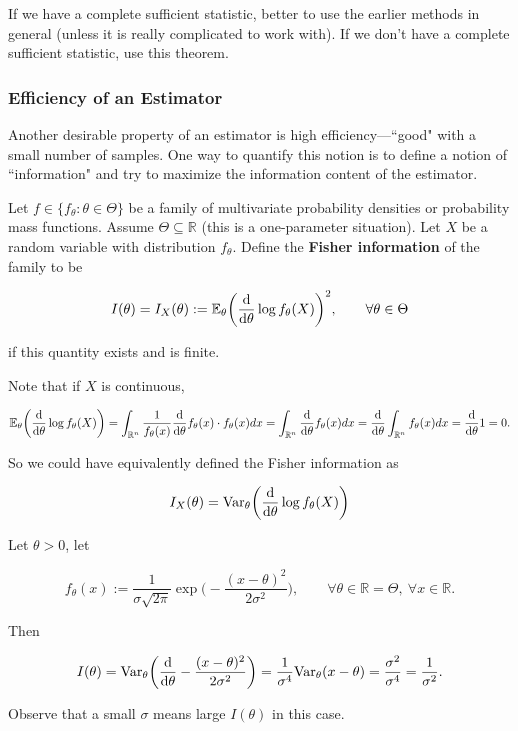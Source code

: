 \begin{remark} If we have a complete sufficient statistic, better to use the earlier methods in general (unless it is really complicated to work with). If we don't have a complete sufficient statistic, use this theorem.

\end{remark}

\subsubsection{Efficiency of an Estimator} Another desirable property of an estimator is high efficiency---``good" with a small number of samples. One way to quantify this notion is to define a notion of ``information" and try to maximize the information content of the estimator.

\begin{definition} Let \(f \in \{f_\theta: \theta \in \Theta \}\) be a family of multivariate probability densities or probability mass functions. Assume \(\Theta \subseteq \mathbb{R}\) (this is a one-parameter situation). Let \(X\) be a random variable with distribution \(f_\theta\). Define the \textbf{Fisher information} of the family to be

\[
I(\theta) = I_X(\theta) := \E_\theta \bigg( \deriv{}{\theta} \log f_\theta (X) \bigg)^2, \qquad \forall \theta \in \Theta
\]

if this quantity exists and is finite.

\end{definition}

\begin{remark} Note that if \(X\) is continuous, 

\[
\E_\theta \bigg( \deriv{}{\theta} \log f_\theta (X) \bigg) = \int_{\mathbb{R}^n} \frac{1}{f_\theta(x)} \deriv{}{\theta} f_\theta(x) \cdot f_\theta(x) dx = \int_{\mathbb{R}^n} \deriv{}{\theta} f_\theta(x) dx = \deriv{}{\theta} \int_{\mathbb{R}^n} f_\theta(x) dx = \deriv{}{\theta} 1   = 0.
\]

So we could have equivalently defined the Fisher information as 

\[
I_X(\theta) = \Var_\theta \bigg( \deriv{}{\theta} \log f_\theta (X) \bigg)
\]

\end{remark}

\begin{example} Let \(\theta > 0\), let 

\[
f_\theta(x) := \frac{1}{\sigma \sqrt{2 \pi}} \exp\bigg( - \frac{(x-\theta)^2}{2 \sigma^2} \bigg), \qquad \forall \theta \in \mathbb{R} = \Theta, \ \forall x \in \mathbb{R}.
\]

Then

\[
I(\theta) = \Var_\theta \bigg( \deriv{}{\theta} - \frac{(x- \theta)^2}{2 \sigma^2} \bigg) = \frac{1}{\sigma^4} \Var_\theta(x-\theta) = \frac{\sigma^2}{\sigma^4} = \frac{1}{\sigma^2}.
\]

Observe that a small \(\sigma\) means large \(I(\theta)\) in this case.

\end{example}

